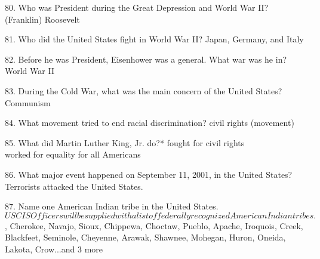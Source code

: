 \documentclass[avery5371,frame]{flashcards}
\begin{document}
        \begin{flashcard}{80. Who was President during the Great Depression and World War II?}
        {(Franklin) Roosevelt}
        \end{flashcard}
        \begin{flashcard}{81. Who did the United States fight in World War II?}
        {Japan, Germany, and Italy}
        \end{flashcard}
        \begin{flashcard}{82. Before he was President, Eisenhower was a general. What war was he in?}
        {World War II}
        \end{flashcard}
        \begin{flashcard}{83. During the Cold War, what was the main concern of the United States?}
        {Communism}
        \end{flashcard}
        \begin{flashcard}{84. What movement tried to end racial discrimination?}
        {civil rights (movement)}
        \end{flashcard}
        \begin{flashcard}{85. What did Martin Luther King, Jr. do?*}
        {fought for civil rights\\worked for equality for all Americans}
        \end{flashcard}
        \begin{flashcard}{86. What major event happened on September 11, 2001, in the United States?}
        {Terrorists attacked the United States.}
        \end{flashcard}
        \begin{flashcard}{87. Name one American Indian tribe in the United States.}
        {\[USCIS Officers will be supplied with a list of federally recognized American Indian tribes.\]\footnotesize, Cherokee\footnotesize, Navajo\footnotesize, Sioux\footnotesize, Chippewa\footnotesize, Choctaw\footnotesize, Pueblo\footnotesize, Apache\footnotesize, Iroquois\footnotesize, Creek\footnotesize, Blackfeet\footnotesize, Seminole\footnotesize, Cheyenne\footnotesize, Arawak\footnotesize, Shawnee\footnotesize, Mohegan\footnotesize, Huron\footnotesize, Oneida\footnotesize, Lakota\footnotesize, Crow...and 3 more}
        \end{flashcard}
\end{document}
